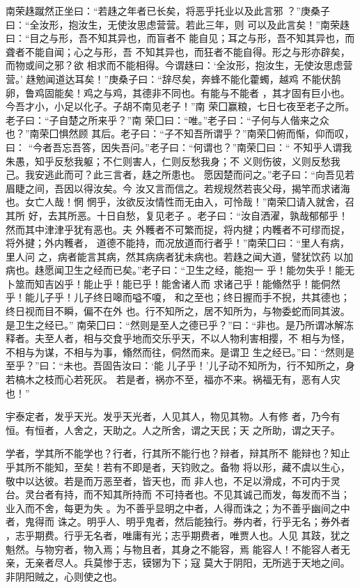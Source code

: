 \documentclass[a4paper,12pt,UTF8,twoside]{ctexbook}
\begin{document}
南荣趎蹴然正坐曰：“若趎之年者已长矣，将恶乎托业以及此言邪 ？”庚桑子曰：“全汝形，抱汝生，无使汝思虑营营。若此三年，则 可以及此言矣！”南荣趎曰：“目之与形，吾不知其异也，而盲者不 能自见；耳之与形，吾不知其异也，而聋者不能自闻；心之与形，吾 不知其异也，而狂者不能自得。形之与形亦辟矣，而物或间之邪？欲 相求而不能相得。今谓趎曰：‘全汝形，抱汝生，无使汝思虑营营。’ 趎勉闻道达耳矣！”庚桑子曰：“辞尽矣，奔蜂不能化藿蠋，越鸡 不能伏鹄卵，鲁鸡固能矣！鸡之与鸡，其德非不同也。有能与不能者 ，其才固有巨小也。今吾才小，小足以化子。子胡不南见老子！”南 荣囗赢粮，七日七夜至老子之所。老子曰：“子自楚之所来乎？”南 荣囗曰：“唯。”老子曰：“子何与人偕来之众也？”南荣囗惧然顾 其后。老子曰：“子不知吾所谓乎？”南荣囗俯而惭，仰而叹，曰： “今者吾忘吾答，因失吾问。”老子曰：“何谓也？”南荣囗曰：“ 不知乎人谓我朱愚，知乎反愁我躯；不仁则害人，仁则反愁我身；不 义则伤彼，义则反愁我己。我安逃此而可？此三言者，趎之所患也。 愿因楚而问之。”老子曰：“向吾见若眉睫之间，吾因以得汝矣。今 汝又言而信之。若规规然若丧父母，揭竿而求诸海也。女亡人哉！惘 惘乎，汝欲反汝情性而无由入，可怜哉！”南荣囗请入就舍，召其所 好，去其所恶。十日自愁，复见老子 。老子曰：“汝自洒濯，孰哉郁郁乎！然而其中津津乎犹有恶也。夫 外韄者不可繁而捉，将内揵；内韄者不可缪而捉，将外揵；外内韄者， 道德不能持，而况放道而行者乎！”南荣囗曰：“里人有病，里人问 之，病者能言其病，然其病病者犹未病也。若趎之闻大道，譬犹饮药 以加病也。趎愿闻卫生之经而已矣。”老子曰：“卫生之经，能抱一 乎！能勿失乎！能无卜筮而知吉凶乎！能止乎！能已乎！能舍诸人而 求诸己乎！能翛然乎！能侗然乎！能儿子乎！儿子终日嗥而嗌不嗄， 和之至也；终日握而手不掜，共其德也；终日视而目不瞬，偏不在外 也。行不知所之，居不知所为，与物委蛇而同其波。是卫生之经已。” 南荣囗曰：“然则是至人之德已乎？”曰：“非也。是乃所谓冰解冻 释者。夫至人者，相与交食乎地而交乐乎天，不以人物利害相撄，不 相与为怪，不相与为谋，不相与为事，翛然而往，侗然而来。是谓卫 生之经已。”曰：“然则是至乎？”曰：“未也。吾固告汝曰：‘能 儿子乎！’儿子动不知所为，行不知所之，身若槁木之枝而心若死灰。 若是者，祸亦不至，福亦不来。祸福无有，恶有人灾也！”

宇泰定者，发乎天光。发乎天光者，人见其人，物见其物。人有修 者，乃今有恒。有恒者，人舍之，天助之。人之所舍，谓之天民；天 之所助，谓之天子。

学者，学其所不能学也？行者，行其所不能行也？辩者，辩其所不 能辩也？知止乎其所不能知，至矣！若有不即是者，天钧败之。备物 将以形，藏不虞以生心，敬中以达彼。若是而万恶至者，皆天也，而 非人也，不足以滑成，不可内于灵台。灵台者有持，而不知其所持而 不可持者也。不见其诚己而发，每发而不当；业入而不舍，每更为失 。为不善乎显明之中者，人得而诛之；为不善乎幽间之中者，鬼得而 诛之。明乎人、明乎鬼者，然后能独行。券内者，行乎无名；券外者 ，志乎期费。行乎无名者，唯庸有光；志乎期费者，唯贾人也。人见 其跂，犹之魁然。与物穷者，物入焉；与物且者，其身之不能容，焉 能容人！不能容人者无亲，无亲者尽人。兵莫惨于志，镆铘为下；寇 莫大于阴阳，无所逃于天地之间。非阴阳贼之，心则使之也。
\end{document}
